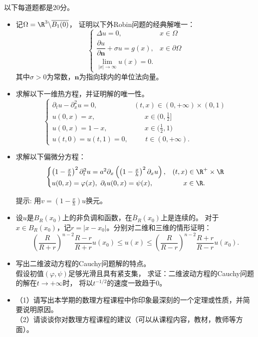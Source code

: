 以下每道题都是20分。
\begin{itemize}
    \item[1.] 记$ \Omega =\R^3\backslash\overline{B_1(0)}$，
    证明以下外Robin问题的经典解唯一：
    \[
    \begin{cases}
        \Delta u=0,&x\in\Omega\\
        \dfrac{\partial u}{\partial\boldsymbol{n}}+\sigma u=g(x),&x\in\partial \Omega\\
        \lim\limits_{|x|\rightarrow \infty}u(x)=0.&
    \end{cases}
    \]
    其中$\sigma>0$为常数，$\boldsymbol{n}$为指向球内的单位法向量。

    \item[2.] 求解以下一维热方程，并证明解的唯一性。
    \[\begin{cases}
        \partial_tu-\partial_x^2u=0,&(t,x)\in(0,+\infty)\times(0,1)\\
        u(0,x)=x,&\quad\ \,\,x\in\big(0,\frac12\big]\\
        u(0,x)=1-x,&\quad\ \,\,x\in\big(\frac12,1\big)\\
        u(t,0)=u(t,1)=0,&\ \ \ \quad t\in(0,+\infty).
    \end{cases}\]

    \item[3.] 求解以下偏微分方程：
    \[
    \begin{cases}
    
        	\left( 1-\frac{x}{h} \right)^2 \partial _{t}^{2}u
            =a^2\partial _x\left( \left( 1-\frac{x}{h} \right) ^2\partial _xu \right),
            & (t,x)\in\R^+\times\R\\
        	u( 0,x ) =\varphi(x),\ \partial _tu( 0,x ) =\psi(x),
            & \hspace{1.55em} x\in\R.\\
    \end{cases}
    \]
    
    提示: 用$ v=\left( 1-\frac{x}{h} \right) u $换元。

    \item[4.] 设$u$是$ B_{R}(x_0) $上的非负调和函数，在$\bar{B}_R(x_0)$上是连续的。
    对于$ x\in B_R(x_0) $，记$r=|x-x_0|$。分别对二维和三维的情形证明：
    $$
    \left( \frac{R}{R+r} \right)^{n-2}\frac{R-r}{R+r}u(x_0) 
    \le u(x) \le \left( \frac{R}{R-r} \right)^{n-2}\frac{R+r}{R-r}u(x_0). 
    $$

    \item[5.] 写出二维波动方程的Cauchy问题解的特点。\\
    假设初值$( \varphi ,\psi ) $足够光滑且具有紧支集，
    求证：二维波动方程的Cauchy问题的解在$t \to +\infty$时，
    将以$ t^{-1/2} $的速度一致趋于$0$。

    \item[6.] 
    （1）请写出本学期的数理方程课程中你印象最深刻的一个定理或性质，并简要说明原因。\\
    （2）请谈谈你对数理方程课程的建议（可以从课程内容，教材，教师等方面）。
\end{itemize}

